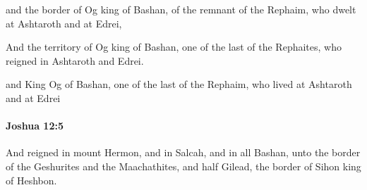 			\begin{versebox}
					\item[BHS] 
					\item[ASV] and the border of Og king of Bashan, of the remnant of the Rephaim, who dwelt at Ashtaroth and at Edrei,
					\item[NIV] And the territory of Og king of Bashan, one of the last of the Rephaites, who reigned in Ashtaroth and Edrei.
					\item[NRSV] and King Og of Bashan, one of the last of the Rephaim, who lived at Ashtaroth and at Edrei
			\end{versebox}

		\paragraph{Joshua 12:5} %
			\label{JOSHUA-12-5}

			And reigned in mount Hermon, and in Salcah, and in all Bashan, unto the border of the Geshurites and the Maachathites, and half Gilead, the border of Sihon king of Heshbon.

